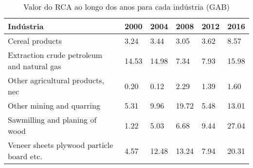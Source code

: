 \begin{table}
\centering
\caption{Valor do RCA ao longo dos anos para cada indústria (GAB)}
\begin{tabular}{p{6cm}p{1.5cm}p{1.5cm}p{1.5cm}p{1.5cm}p{1.5cm}}
\toprule
                                 Indústria &  2000 &  2004 &  2008 & 2012 &  2016 \\
\midrule
                           Cereal products &  3.24 &  3.44 &  3.05 & 3.62 &  8.57 \\
Extraction crude petroleum and natural gas & 14.53 & 14.98 &  7.34 & 7.93 & 15.98 \\
          Other agricultural products, nec &  0.20 &  0.12 &  2.29 & 1.39 &  1.60 \\
                 Other mining and quarring &  5.31 &  9.96 & 19.72 & 5.48 & 13.01 \\
            Sawmilling and planing of wood &  1.22 &  5.03 &  6.68 & 9.44 & 27.04 \\
 Veneer sheets plywood particle board etc. &  4.57 & 12.48 & 13.24 & 7.94 & 20.31 \\
\bottomrule
\end{tabular}
\end{table}
